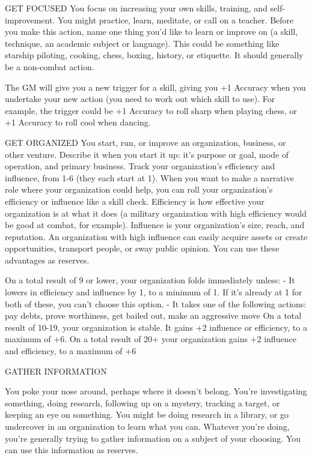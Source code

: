 GET FOCUSED
You focus on increasing your own skills, training, and self-improvement. You might practice, learn,
meditate, or call on a teacher. Before you make this action, name one thing you’d like to learn or
improve on (a skill, technique, an academic subject or language). This could be something like
starship piloting, cooking, chess, boxing, history, or etiquette. It should generally be a non-combat
action.

The GM will give you a new trigger for a skill, giving you +1 Accuracy when you undertake your
new action (you need to work out which skill to use). For example, the trigger could be +1
Accuracy to roll sharp when playing chess, or +1 Accuracy to roll cool when dancing.

GET ORGANIZED
You start, run, or improve an organization, business, or other venture. Describe it when you start it
up: it’s purpose or goal, mode of operation, and primary business. Track your organization’s
efficiency and influence, from 1-6 (they each start at 1). When you want to make a narrative role
where your organization could help, you can roll your organization’s efficiency or influence like a
skill check. Efficiency is how effective your organization is at what it does (a military organization
with high efficiency would be good at combat, for example). Influence is your organization’s size,
reach, and reputation. An organization with high influence can easily acquire assets or create
opportunities, transport people, or sway public opinion. You can use these advantages as
reserves.

On a total result of 9 or lower, your organization folds immediately unless:
    -    It lowers in efficiency and influence by 1, to a minimum of 1. If it’s already at 1 for both of
         these, you can’t choose this option.
    -    It takes one of the following actions: pay debts, prove worthiness, get bailed out, make an
         aggressive move
On a total result of 10-19, your organization is stable. It gains +2 influence or efficiency, to a
maximum of +6.
On a total result of 20+ your organization gains +2 influence and efficiency, to a maximum of +6

GATHER INFORMATION




You poke your nose around, perhaps where it doesn’t belong. You’re investigating something,
doing research, following up on a mystery, tracking a target, or keeping an eye on something. You
might be doing research in a library, or go undercover in an organization to learn what you can.
Whatever you’re doing, you’re generally trying to gather information on a subject of your choosing.
You can use this information as reserves.

